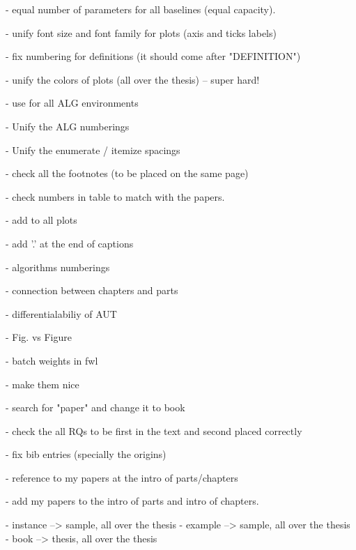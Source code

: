  - equal number of parameters for all baselines (equal capacity).

 - unify font size and font family for plots (axis and ticks labels)
 
 - fix numbering for definitions (it should come after "DEFINITION")
 
 - unify the colors of plots (all over the thesis) -- super hard!
 
 - use \small for all ALG environments
 
 - Unify the ALG numberings
 
 - Unify the enumerate / itemize spacings
 
 - check all the footnotes (to be placed on the same page)
 
 - check numbers in table to match with the papers.
 
 - add \selectfont to all plots
 
 - add '.' at the end of captions
 
 - algorithms numberings
 
 - connection between chapters and parts
 
 - differentialabiliy of AUT
 
 - Fig. vs Figure
 
 - batch weights in fwl
 
 - \url{} make them nice
 
 - search for "paper" and change it to book
 
 - check the all RQs to be first in the text and second placed correctly
 
 - fix bib entries (specially the origins)
 
 - reference to my papers at the intro of parts/chapters
 
 - add my papers to the intro of parts and intro of chapters.
 
 - instance --> sample, all over the thesis
 - example --> sample, all over the thesis
 - book --> thesis, all over the thesis